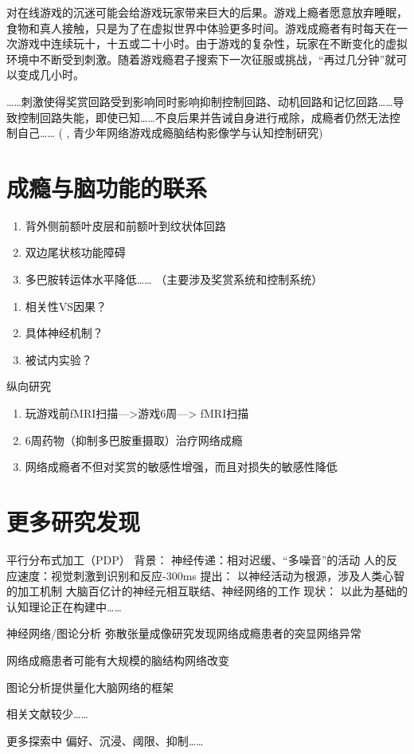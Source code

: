 对在线游戏的沉迷可能会给游戏玩家带来巨大的后果。游戏上瘾者愿意放弃睡眠，食物和真人接触，只是为了在虚拟世界中体验更多时间。游戏成瘾者有时每天在一次游戏中连续玩十，十五或二十小时。由于游戏的复杂性，玩家在不断变化的虚拟环境中不断受到刺激。随着游戏瘾君子搜索下一次征服或挑战，“再过几分钟”就可以变成几小时。



……刺激使得奖赏回路受到影响同时影响抑制控制回路、动机回路和记忆回路……导致控制回路失能，即使已知……不良后果并告诫自身进行戒除，成瘾者仍然无法控制自己……
	(	\cite{}, 青少年网络游戏成瘾脑结构影像学与认知控制研究)


\section*{成瘾与脑功能的联系}

\begin{enumerate}
\item 背外侧前额叶皮层和前额叶到纹状体回路
\item 双边尾状核功能障碍
\item 多巴胺转运体水平降低……
（主要涉及奖赏系统和控制系统）
\end{enumerate}

\begin{enumerate}
\item 相关性VS因果？
\item 具体神经机制？
\item 被试内实验？
\end{enumerate}

{纵向研究}
\begin{enumerate}
\item 玩游戏前fMRI扫描—>游戏6周—> fMRI扫描

\item 6周药物（抑制多巴胺重摄取）治疗网络成瘾

\item 网络成瘾者不但对奖赏的敏感性增强，而且对损失的敏感性降低 

\end{enumerate}

\section*{更多研究发现}
平行分布式加工（PDP）
背景：
神经传递：相对迟缓、“多噪音”的活动
人的反应速度：视觉刺激到识别和反应-300ms
提出：
以神经活动为根源，涉及人类心智的加工机制  
大脑百亿计的神经元相互联结、神经网络的工作
现状：
以此为基础的认知理论正在构建中……


神经网络/图论分析
弥散张量成像研究发现网络成瘾患者的突显网络异常

网络成瘾患者可能有大规模的脑结构网络改变

图论分析提供量化大脑网络的框架

相关文献较少……

更多探索中
偏好、沉浸、阈限、抑制……


